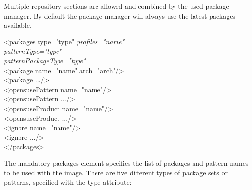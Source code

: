 Multiple repository sections are allowed and combined by the
used package manager. By default the package manager will always use
the latest packages available.

\begin{Command}{12cm}
<packages type="type" \textit{profiles="name"}\\
\hspace*{2.5cm}\textit{patternType="type"}\\
\hspace*{2.5cm}\textit{patternPackageType="type"}\\
\hspace*{1cm}<package name="name" arch="arch"/>\\
\hspace*{1cm}<package .../>\\
\hspace*{1cm}<opensusePattern name="name"/>\\
\hspace*{1cm}<opensusePattern .../>\\
\hspace*{1cm}<opensuseProduct name="name"/>\\
\hspace*{1cm}<opensuseProduct .../>\\
\hspace*{1cm}<ignore name="name"/>\\
\hspace*{1cm}<ignore .../>\\
</packages>
\end{Command}

The mandatory packages element specifies the list of packages and
pattern names to be used with the image. There are five different
types of package sets or patterns, specified with the type attribute:

